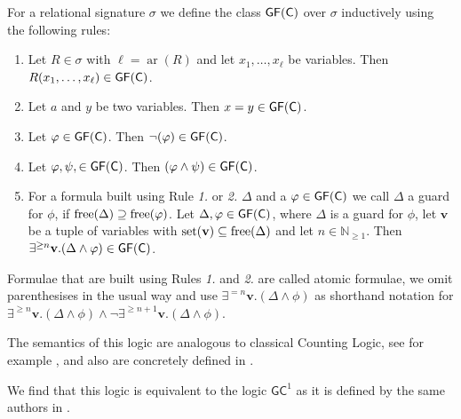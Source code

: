 \begin{definition}
	\label{def:GFC}
	For a relational signature $\sigma$ we define the class $\mathsf{GF}(\mathsf{C})$ over $\sigma$ inductively using the following rules:
	\begin{enumerate}
		\item Let $R\in\sigma$ with $\ell=\operatorname{ar}(R)$ and let $x_1,\dots,x_\ell$ be variables. Then $R(x_1,\dots,x_\ell)\in \mathsf{GF}(\mathsf{C})$.
		\item Let $a$ and $y$ be two variables. 
		Then $x=y\in\mathsf{GF}(\mathsf{C})$.
		\item Let $\varphi\in\mathsf{GF}(\mathsf{C})$.
		Then $\neg(\varphi)\in\mathsf{GF}(\mathsf{C})$.
		\item Let $\varphi,\psi,\in\mathsf{GF}(\mathsf{C})$. 
		Then $(\varphi\land\psi)\in\mathsf{GF}(\mathsf{C})$.
		\item For a formula built using Rule \emph{1.} or \emph{2.} $\Delta$ and a $\varphi\in\mathsf{GF}(\mathsf{C})$ we call $\Delta$ a guard for $\phi$, if $\operatorname{free}(\Delta)\supseteq\operatorname{free}(\varphi)$.
		Let $\Delta,\varphi\in \mathsf{GF}(\mathsf{C})$, where $\Delta$ is a guard for $\phi$, let $\mathbf v$ be a tuple of variables with $\operatorname{set}(\mathbf v)\subseteq \operatorname{free}(\Delta)$ and let $n\in \mathbb N_{\geq 1}$. 
		Then $\exists^{\geq n}\mathbf v . (\Delta \land \varphi)\in \mathsf{GF}(\mathsf{C})$.
	\end{enumerate}
	Formulae that are built using Rules \emph{1.} and \emph{2.} are called atomic formulae, we omit parenthesises in the usual way and use $\exists^{=n}\mathbf v.(\Delta\land\phi)$ as shorthand notation for $\exists^{\geq n}\mathbf v.(\Delta\land\phi)\land \neg\exists^{\geq n+1}\mathbf v.(\Delta\land\phi)$.
	
	The semantics of this logic are analogous to classical Counting Logic, see for example \cite{cai1992OptimalLower}, and also are concretely defined in \cite{scheidt2025ColorRefinement}.
\end{definition}
We find that this logic is equivalent to the logic $\mathsf{GC}^1$ as it is defined by the same authors in \cite{scheidt2023CountingHomomorphisms}.

